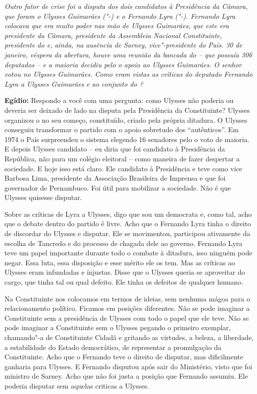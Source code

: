 \emph{Outro fator de crise foi a disputa dos dois candidatos à
Presidência da Câmara, que foram o Ulysses Guimarães ("-) e o
Fernando Lyra ("-). Fernando Lyra colocava que era muito poder nas
mão de Ulysses Guimarães, que este era presidente da Câmara, presidente
da Assembleia Nacional Constituinte, presidente do  e, ainda, na
ausência de Sarney, vice"-presidente do País. 30 de janeiro,
véspera da abertura, houve uma reunião da bancada do  -- que possuía
306 deputados -- e a maioria decidiu pelo o apoio ao Ulysses Guimarães.
O senhor votou no Ulysses Guimarães. Como eram vistas as críticas do
deputado Fernando Lyra a Ulysses Guimarães e ao conjunto do ?}

\textbf{Egídio:} Respondo a você com uma pergunta: como Ulysses não
poderia ou deveria ser deixado de lado na disputa pela Presidência da
Constituinte? Ulysses organizou o  no seu começo, constituído, criado
pela própria ditadura. O Ulysses conseguiu transformar o partido com o
apoio sobretudo dos ``autênticos''. Em 1974 o País surpreendeu o sistema
elegendo 16 senadores pelo o voto de maioria. E depois Ulysses candidato
-- eu diria que foi candidato à Presidência da República, não para um
colégio eleitoral -- como maneira de fazer despertar a sociedade. E hoje
isso está claro. Ele candidato à Presidência e teve como vice Barbosa
Lima, presidente da Associação Brasileira de Imprensa e que foi
governador de Pernambuco. Foi útil para mobilizar a sociedade. Não é que
Ulysses quisesse disputar.

Sobre as críticas de Lyra a Ulysses, digo que sou um democrata e, como
tal, acho que o debate dentro do partido é livre. Acho que o Fernando
Lyra tinha o direito de discordar do Ulysses e disputar. Ele se
movimentou, participou ativamente da escolha de Tancredo e do processo
de chagada dele ao governo. Fernando Lyra teve um papel importante
durante todo o combate à ditadura, isso ninguém pode negar. Essa luta,
essa disposição e esse mérito ele os tem. Mas as críticas ao Ulysses
eram infundadas e injustas. Disse que o Ulysses queria se aproveitar do
cargo, que tinha tal ou qual defeito. Ele tinha os defeitos de qualquer
humano.

Na Constituinte nos colocamos em termos de ideias, sem nenhuma mágoa
para o relacionamento político. Ficamos em posições diferentes. Não se
pode imaginar a Constituinte sem a presidência de Ulysses com todo o
papel que ele teve. Não se pode imaginar a Constituinte sem o Ulysses
pegando o primeiro exemplar, chamando"-a de Constituinte Cidadã e
gritando as virtudes, a beleza, a liberdade, a estabilidade do Estado
democrático, de representar a promulgação da Constituinte. Acho que o
Fernando teve o direito de disputar, mas dificilmente ganharia para
Ulysses. E Fernando disputou após sair do Ministério, visto que foi
ministro de Sarney. Acho que não foi justa a posição que Fernando
assumiu. Ele poderia disputar sem aquelas criticas a Ulysses.

